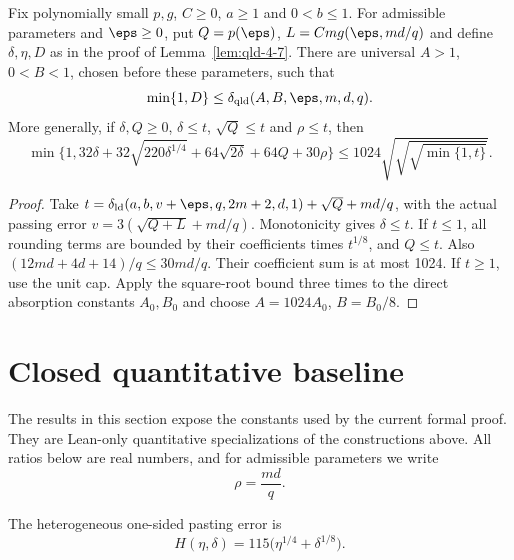 \begin{theorem}
\label{thm:qld-actual-rounded-error-bound}
\leanok
Fix polynomially small $p,g$, $C\geq0$, $a\geq1$ and $0<b\leq1$.
For admissible parameters and $\eps\geq0$, put $Q=p(\eps)$,
$L=Cm g(\eps,md/q)$ and define $\delta,\eta,D$ as in the proof of
Lemma~\ref{lem:qld-4-7}. There are universal $A>1$, $0<B<1$, chosen
before these parameters, such that
\[
 \min\{1,D\}\leq\delta_{\rm qld}(A,B,\eps,m,d,q).
\]
More generally, if $\delta,Q\geq0$, $\delta\leq t$, $\sqrt Q\leq t$ and
$\rho\leq t$, then
\[
 \min\{1,32\delta+32\sqrt{220\delta^{1/4}}+
 64\sqrt{2\delta}+64Q+30\rho\}
 \leq1024\sqrt{\sqrt{\sqrt{\min\{1,t\}}}}.
\]
\end{theorem}
\begin{proof}
\leanok
{}
Take $t=\delta_{\rm ld}(a,b,v+\eps,q,2m+2,d,1)+\sqrt Q+md/q$,
with the actual passing error $v=3(\sqrt{Q+L}+md/q)$.
Monotonicity gives $\delta\leq t$. If $t\leq1$, all rounding terms
are bounded by their coefficients times $t^{1/8}$, and $Q\leq t$.
Also $(12md+4d+14)/q\leq30md/q$. Their coefficient sum is at most 1024.
If $t\geq1$, use the unit cap. Apply the square-root bound three times
to the direct absorption constants $A_0,B_0$ and choose
$A=1024A_0$, $B=B_0/8$.
\end{proof}

\section{Closed quantitative baseline}
\label{sec:qld-combining-explicit}

The results in this section expose the constants used by the current formal
proof.  They are Lean-only quantitative specializations of the constructions
above.  All ratios below are real numbers, and for admissible parameters we
write
\[
  \rho=\frac{md}{q}.
\]

\begin{definition}
\label{def:qld-heterogeneous-pasting-error-explicit}
\leanok
The heterogeneous one-sided pasting error is
\[
  H(\eta,\delta)=115\bigl(\eta^{1/4}+\delta^{1/8}\bigr).
\]
\end{definition}

